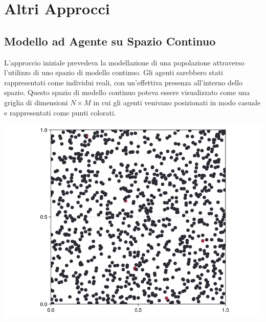 \section{Altri Approcci}

\subsection{Modello ad Agente su Spazio Continuo}

L'approccio iniziale prevedeva la modellazione di una popolazione 
attraverso l'utilizzo di uno spazio di modello continuo. 
Gli agenti sarebbero stati rappresentati come individui reali, 
con un'effettiva presenza all'interno dello spazio. Questo spazio 
di modello continuo poteva essere visualizzato come una griglia di 
dimensioni $N \times M$ in cui gli agenti venivano posizionati in 
modo casuale e rappresentati come punti colorati.

\begin{minipage}{\linewidth}
    \centering
    \includegraphics[width=\textwidth]{img/ball-covid.png}
    \label{fig:ball_covid}
\end{minipage}

